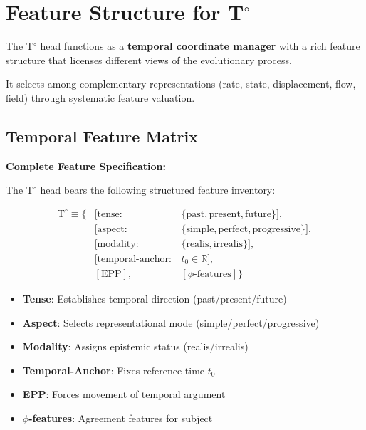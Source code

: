 \documentclass[11pt]{article}
\theoremstyle{defstyle}
\theoremstyle{mapstyle}
\newenvironment{theorembox}
{\begin{tcolorbox}[
  enhanced,
  enforce breakable,
  colback=defbox,
  colframe=theoremgreen!60,
  boxrule=1pt,
  arc=4pt,
  left=8pt,right=8pt,top=8pt,bottom=8pt,
  before skip=10pt,after skip=10pt
]}
{\end{tcolorbox}}
\newenvironment{keyinsight}
{\begin{tcolorbox}[
  enhanced,
  colback=keybox,
  colframe=headerblue,
  boxrule=1.2pt,
  arc=4pt,
  left=10pt,right=10pt,top=10pt,bottom=10pt,
  before skip=12pt,after skip=12pt
]}
{\end{tcolorbox}}
\begin{document}
\vspace{2\baselineskip}

\section{Feature Structure for T$^\circ$}

\begin{keyinsight}
The T$^\circ$ head functions as a \textbf{temporal coordinate manager} with a rich feature structure that licenses different views of the evolutionary process.

It selects among complementary representations (rate, state, displacement, flow, field) through systematic feature valuation.
\end{keyinsight}

\subsection{Temporal Feature Matrix}

\begin{theorembox}
\textbf{Complete Feature Specification:}

The T$^\circ$ head bears the following structured feature inventory:

\[
\begin{array}{lll}
\text{T}^\circ \equiv \Big\{ & [\text{tense}: & \{\text{past}, \text{present}, \text{future}\}], \\
& [\text{aspect}: & \{\text{simple}, \text{perfect}, \text{progressive}\}], \\
& [\text{modality}: & \{\text{realis}, \text{irrealis}\}], \\
& [\text{temporal-anchor}: & t_0 \in \mathbb{R}], \\
& [\text{EPP}], & [\phi\text{-features}] \Big\}
\end{array}
\]

\begin{itemize}
\item \textbf{Tense}: Establishes temporal direction (past/present/future)
\item \textbf{Aspect}: Selects representational mode (simple/perfect/progressive)
\item \textbf{Modality}: Assigns epistemic status (realis/irrealis)
\item \textbf{Temporal-Anchor}: Fixes reference time $t_0$
\item \textbf{EPP}: Forces movement of temporal argument
\item \textbf{$\phi$-features}: Agreement features for subject
\end{itemize}
\end{theorembox}
\end{document}
